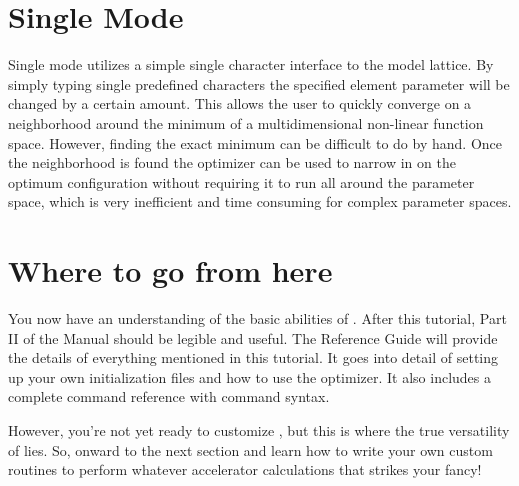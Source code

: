 
\section{Single Mode}
\label{s:single_mode}

Single mode utilizes a simple single character interface to the \tao model
lattice.  By simply typing single predefined characters the specified element
parameter will be changed by a certain amount. This allows the user to quickly
converge on a neighborhood around the minimum of a multidimensional non-linear
function space. However, finding the exact minimum can be difficult to do by
hand. Once the neighborhood is found the optimizer can be used to narrow in on
the optimum configuration without requiring it to run all around the parameter
space, which is very inefficient and time consuming for complex parameter
spaces.


\section{Where to go from here}
\label{s:where_to_go}

You now have an understanding of the basic abilities of \tao. After this
tutorial, Part II of the \tao Manual should be legible and useful.
The Reference Guide will provide the details of everything mentioned in this tutorial. 
It goes into detail of setting up your own initialization
files and how to use the optimizer. It also includes a complete command
reference with command syntax.

However, you're not yet ready to customize \tao, but this is where the true versatility
of \tao lies. So, onward to the next section and learn how to write your
own custom routines to perform whatever accelerator calculations that strikes your
fancy!

